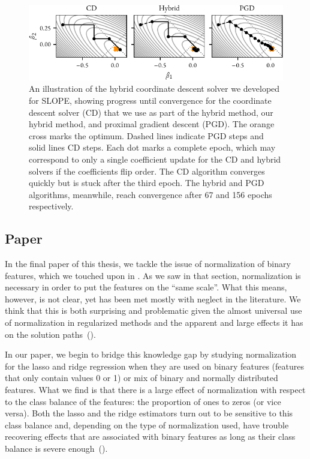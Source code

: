 \begin{figure}[htpb]
  \centering
  \includegraphics[]{figures/illustration_solvers_thesis.pdf}
  \caption{%
    An illustration of the hybrid coordinate descent solver we developed for SLOPE,
    showing progress until convergence for the coordinate descent solver (CD) that we use as part of the hybrid method, our hybrid method, and proximal gradient descent (PGD).
    The orange cross marks the optimum.
    Dashed lines indicate PGD steps and solid lines CD steps. Each dot marks a complete epoch, which may correspond to only a single coefficient update for the CD and hybrid solvers if the coefficients flip order. The CD algorithm converges quickly but is stuck after the third epoch. The hybrid and PGD algorithms, meanwhile, reach convergence after 67 and 156 epochs respectively.
  }
  \label{fig:paper5-highlight}
\end{figure}

\subsection{Paper \VI}

In the final paper of this thesis, we tackle the issue of normalization of binary features, which we touched upon in . As we saw in that section, normalization is necessary in order to put the features on the ``same scale''. What this means, however, is not clear, yet has been met mostly with neglect in the literature. We think that this is both surprising and problematic given the almost universal use of normalization in regularized methods and the apparent and large effects it has on the solution paths~().

In our paper, we begin to bridge this knowledge gap by studying normalization for the lasso and ridge regression when they are used on binary features (features that only contain values 0 or 1) or mix of binary and normally distributed features. What we find is that there is a large effect of normalization with respect to the class balance of the features: the proportion of ones to zeros (or vice versa). Both the lasso and the ridge estimators turn out to be sensitive to this class balance and, depending on the type of normalization used, have trouble recovering effects that are associated with binary features as long as their class balance is severe enough~().

